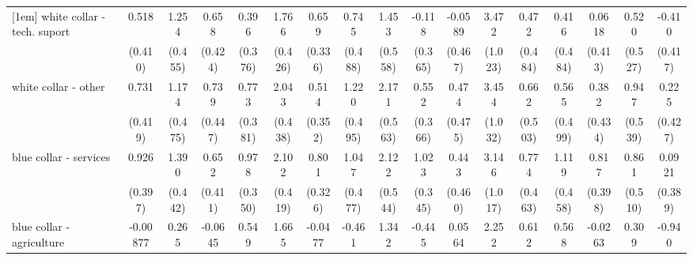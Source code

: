{\begin{tabular}{l*{16}{c}}
[1em]
white collar - tech. suport&       0.518         &       1.254\sym{**} &       0.658         &       0.396         &       1.766\sym{***}&       0.659\sym{*}  &       0.745         &       1.453\sym{**} &      -0.118         &     -0.0589         &       3.472\sym{***}&       0.472         &       0.416         &      0.0618         &       0.520         &      -0.410         \\
                    &     (0.410)         &     (0.455)         &     (0.424)         &     (0.376)         &     (0.426)         &     (0.336)         &     (0.488)         &     (0.558)         &     (0.365)         &     (0.467)         &     (1.023)         &     (0.484)         &     (0.484)         &     (0.413)         &     (0.527)         &     (0.417)         \\
[1em]
white collar - other&       0.731         &       1.174\sym{*}  &       0.739         &       0.773\sym{*}  &       2.043\sym{***}&       0.514         &       1.220\sym{*}  &       2.171\sym{***}&       0.552         &       0.474         &       3.454\sym{***}&       0.662         &       0.565         &       0.382         &       0.947         &       0.225         \\
                    &     (0.419)         &     (0.475)         &     (0.447)         &     (0.381)         &     (0.438)         &     (0.352)         &     (0.495)         &     (0.563)         &     (0.366)         &     (0.475)         &     (1.032)         &     (0.503)         &     (0.499)         &     (0.434)         &     (0.539)         &     (0.427)         \\
[1em]
blue collar - services&       0.926\sym{*}  &       1.390\sym{**} &       0.652         &       0.978\sym{**} &       2.102\sym{***}&       0.801\sym{*}  &       1.047\sym{*}  &       2.122\sym{***}&       1.023\sym{**} &       0.443         &       3.146\sym{**} &       0.774         &       1.119\sym{*}  &       0.817\sym{*}  &       0.861         &      0.0921         \\
                    &     (0.397)         &     (0.442)         &     (0.411)         &     (0.350)         &     (0.419)         &     (0.326)         &     (0.477)         &     (0.544)         &     (0.345)         &     (0.460)         &     (1.017)         &     (0.463)         &     (0.458)         &     (0.398)         &     (0.510)         &     (0.389)         \\
[1em]
blue collar - agriculture&    -0.00877         &       0.265         &     -0.0645         &       0.549         &       1.665\sym{***}&     -0.0477         &      -0.461         &       1.342\sym{*}  &      -0.445         &      0.0564         &       2.252\sym{*}  &       0.612         &       0.568         &     -0.0263         &       0.309         &      -0.940         \\

\end{tabular}}
